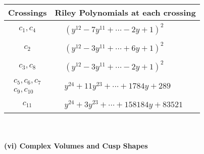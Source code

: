 \documentclass[1p]{elsarticle_modified}
\theoremstyle{definition}
\begin{document}
\begin{tabular}{m{50pt}|m{274pt}}
Crossings & \hspace{64pt}Riley Polynomials at each crossing \\
\hline $$\begin{aligned}c_{1},c_{4}\end{aligned}$$&$\begin{aligned}
&(y^{12}-7 y^{11}+\cdots-2 y+1)^{2}
\end{aligned}$\\
\hline $$\begin{aligned}c_{2}\end{aligned}$$&$\begin{aligned}
&(y^{12}-3 y^{11}+\cdots+6 y+1)^{2}
\end{aligned}$\\
\hline $$\begin{aligned}c_{3},c_{8}\end{aligned}$$&$\begin{aligned}
&(y^{12}-3 y^{11}+\cdots-2 y+1)^{2}
\end{aligned}$\\
\hline $$\begin{aligned}c_{5},c_{6},c_{7}\\c_{9},c_{10}\end{aligned}$$&$\begin{aligned}
&y^{24}+11 y^{23}+\cdots+1784 y+289
\end{aligned}$\\
\hline $$\begin{aligned}c_{11}\end{aligned}$$&$\begin{aligned}
&y^{24}+3 y^{23}+\cdots+158184 y+83521
\end{aligned}$\\
\hline
\end{tabular}\\~\\
\newpage\flushleft \textbf{(vi) Complex Volumes and Cusp Shapes}
\end{document}
